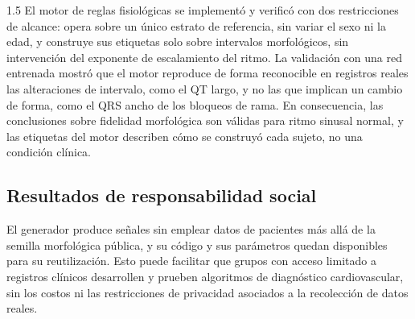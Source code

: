 \begin{spacing}{1.5}
El motor de reglas fisiológicas se implementó y verificó con dos restricciones de alcance: opera sobre un único estrato de referencia, sin variar el sexo ni la edad, y construye sus etiquetas solo sobre intervalos morfológicos, sin intervención del exponente de escalamiento del ritmo. La validación con una red entrenada mostró que el motor reproduce de forma reconocible en registros reales las alteraciones de intervalo, como el QT largo, y no las que implican un cambio de forma, como el QRS ancho de los bloqueos de rama. En consecuencia, las conclusiones sobre fidelidad morfológica son válidas para ritmo sinusal normal, y las etiquetas del motor describen cómo se construyó cada sujeto, no una condición clínica.

\subsection{Resultados de responsabilidad social}

El generador produce señales sin emplear datos de pacientes más allá de la semilla morfológica pública, y su código y sus parámetros quedan disponibles para su reutilización. Esto puede facilitar que grupos con acceso limitado a registros clínicos desarrollen y prueben algoritmos de diagnóstico cardiovascular, sin los costos ni las restricciones de privacidad asociados a la recolección de datos reales.

\end{spacing}
